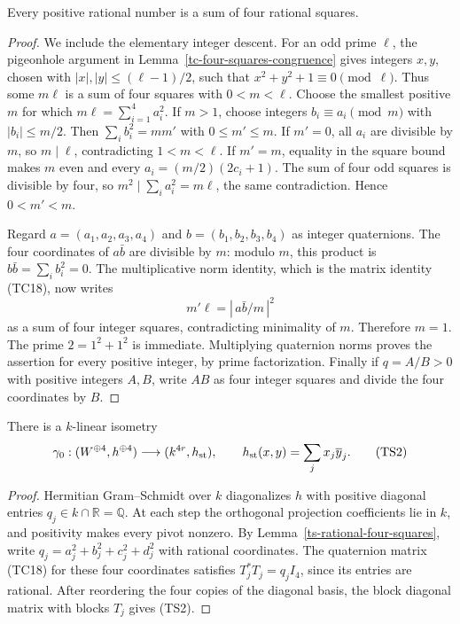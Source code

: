 \begin{lemma}\label{ts-rational-four-squares}
Every positive rational number is a sum of four rational
squares.
\end{lemma}
\begin{proof}
We include the elementary integer descent.
For an odd prime $\ell$, the pigeonhole argument in
Lemma~\ref{tc-four-squares-congruence} gives integers
$x,y$, chosen with $|x|,|y|\le(\ell-1)/2$, such that
$x^2+y^2+1\equiv0\pmod\ell$.
Thus some $m\ell$ is a sum of four squares with
$0<m<\ell$.
Choose the smallest positive $m$ for which
$m\ell=\sum_{i=1}^4a_i^2$.
If $m>1$, choose integers $b_i\equiv a_i\pmod m$
with $|b_i|\le m/2$.  Then
$\sum_i b_i^2=mm'$ with $0\le m'\le m$.
If $m'=0$, all $a_i$ are divisible by $m$, so
$m\mid\ell$, contradicting $1<m<\ell$.
If $m'=m$, equality in the square bound makes $m$
even and every $a_i=(m/2)(2c_i+1)$.
The sum of four odd squares is divisible by four,
so $m^2\mid\sum_i a_i^2=m\ell$, the same contradiction.
Hence $0<m'<m$.

Regard $a=(a_1,a_2,a_3,a_4)$ and $b=(b_1,b_2,b_3,b_4)$
as integer quaternions.
The four coordinates of $a\bar b$ are divisible by $m$:
modulo $m$, this product is $b\bar b=\sum_i b_i^2=0$.
The multiplicative norm identity, which is the matrix
identity (TC18), now writes
\[
                    m'\ell
                      =\left|\,a\bar b/m\,\right|^2
\]
as a sum of four integer squares, contradicting
minimality of $m$.  Therefore $m=1$.
The prime $2=1^2+1^2$ is immediate.
Multiplying quaternion norms proves the assertion for
every positive integer, by prime factorization.
Finally if $q=A/B>0$ with positive integers $A,B$,
write $AB$ as four integer squares and divide the
four coordinates by $B$.
\end{proof}

\begin{proposition}\label{ts-global-isometry}
There is a $k$-linear isometry
\[
        \gamma_0:(W^{\oplus4},h^{\oplus4})
                           \longrightarrow (k^{4r},h_{\rm st}),
 \qquad h_{\rm st}(x,y)=\sum_jx_j\overline y_j.
 \tag{TS2}
\]
\end{proposition}
\begin{proof}
Hermitian Gram--Schmidt over $k$ diagonalizes $h$ with
positive diagonal entries $q_j\in k\cap\mathbb R=\mathbb Q$.
At each step the orthogonal projection coefficients lie in
$k$, and positivity makes every pivot nonzero.
By Lemma~\ref{ts-rational-four-squares}, write
$q_j=a_j^2+b_j^2+c_j^2+d_j^2$ with rational coordinates.
The quaternion matrix (TC18) for these four coordinates
satisfies $T_j^*T_j=q_jI_4$, since its entries are rational.
After reordering the four copies of the diagonal basis,
the block diagonal matrix with blocks $T_j$ gives (TS2).
\end{proof}

